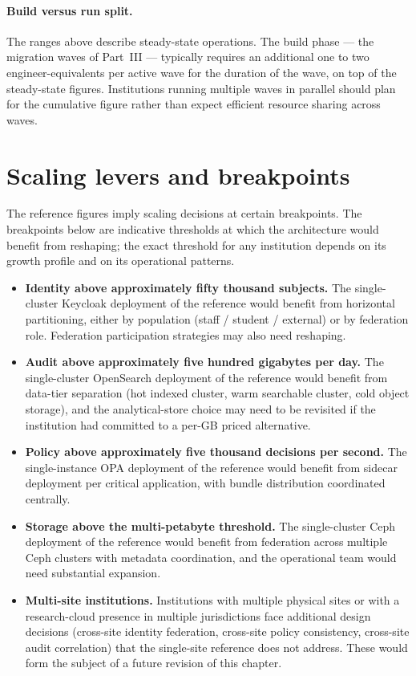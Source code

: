 \paragraph{Build versus run split.} The ranges above describe
steady-state operations. The build phase --- the migration waves of
Part~III --- typically requires an additional one to two
engineer-equivalents per active wave for the duration of the wave,
on top of the steady-state figures. Institutions running multiple
waves in parallel should plan for the cumulative figure rather than
expect efficient resource sharing across waves.

\section{Scaling levers and breakpoints}
\label{sec:sz-scaling}

The reference figures imply scaling decisions at certain
breakpoints. The breakpoints below are indicative thresholds at
which the architecture would benefit from reshaping; the exact
threshold for any institution depends on its growth profile and on
its operational patterns.

\begin{itemize}[leftmargin=1.5em,nosep]
  \item \textbf{Identity above approximately fifty thousand
    subjects.} The single-cluster Keycloak deployment of the
    reference would benefit from horizontal partitioning, either
    by population (staff / student / external) or by federation
    role. Federation participation strategies may also need
    reshaping.
  \item \textbf{Audit above approximately five hundred gigabytes
    per day.} The single-cluster OpenSearch deployment of the
    reference would benefit from data-tier separation (hot indexed
    cluster, warm searchable cluster, cold object storage), and
    the analytical-store choice may need to be revisited if the
    institution had committed to a per-GB priced alternative.
  \item \textbf{Policy above approximately five thousand decisions
    per second.} The single-instance OPA deployment of the
    reference would benefit from sidecar deployment per critical
    application, with bundle distribution coordinated centrally.
  \item \textbf{Storage above the multi-petabyte threshold.} The
    single-cluster Ceph deployment of the reference would benefit
    from federation across multiple Ceph clusters with metadata
    coordination, and the operational team would need substantial
    expansion.
  \item \textbf{Multi-site institutions.} Institutions with
    multiple physical sites or with a research-cloud presence in
    multiple jurisdictions face additional design decisions
    (cross-site identity federation, cross-site policy
    consistency, cross-site audit correlation) that the
    single-site reference does not address. These would form the
    subject of a future revision of this chapter.
\end{itemize}

